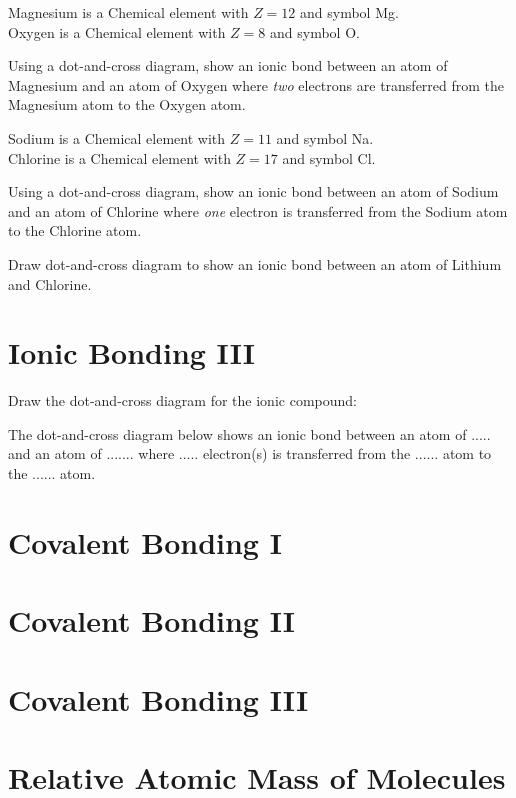 \begin{example}
Magnesium is a Chemical element with $Z = 12$ and symbol Mg. \\
Oxygen is a Chemical element with $Z = 8$ and symbol O. 

Using a dot-and-cross diagram, 
show an ionic bond between an atom of Magnesium and an atom of Oxygen 
where \textit{two} electrons are transferred from the Magnesium atom to 
the Oxygen atom.
\end{example}


\frmrule

\begin{example}
Sodium is a Chemical element with $Z = 11$ and symbol Na. \\
Chlorine is a Chemical element with $Z = 17$ and symbol Cl. 

Using a dot-and-cross diagram, 
show an ionic bond between an atom of Sodium and an atom of Chlorine 
where \textit{one} electron is transferred from the Sodium atom to 
the Chlorine atom.
\end{example}

\frmrule

\begin{example}
Draw dot-and-cross diagram to
show an ionic bond between an atom of Lithium and Chlorine.
\end{example}



\section{Ionic Bonding III}





\frmrule

\begin{example}
Draw the dot-and-cross diagram for the ionic compound: 
\end{example}

\frmrule

\begin{example}
The dot-and-cross diagram below
shows an ionic bond between an atom of ..... and an atom of ....... 
where ..... electron(s) is transferred from the ...... atom to 
the ...... atom. 
\end{example}

\section{Covalent Bonding I}



\section{Covalent Bonding II}


\section{Covalent Bonding III}



\section{Relative Atomic Mass of Molecules}





